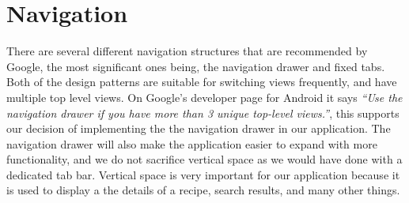 \section{Navigation}\label{sec:navigation}
There are several different navigation structures that are recommended by Google, the most significant ones being, the navigation drawer and fixed tabs. Both of the design patterns are suitable for switching views frequently, and have multiple top level views. 
On Google's developer page for Android it says \textit{``Use the navigation drawer if you have more than 3 unique top-level views.''}\cite{guidelines-navigationdrawer}, this supports our decision of implementing the the navigation drawer in our application. The navigation drawer will also make the application easier to expand with more functionality, and we do not sacrifice vertical space as we would have done with a dedicated tab bar. Vertical space is very important for our application because it is used to display a the details of a recipe, search results, and many other things.

